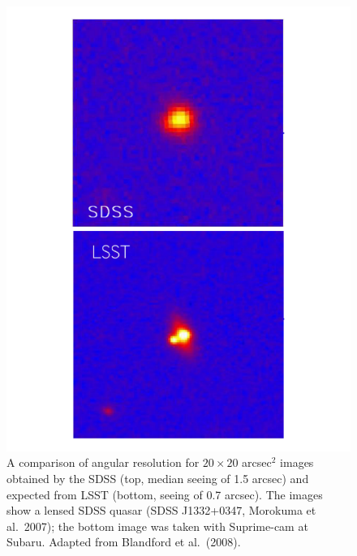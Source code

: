 \begin{figure}
\includegraphics[width=1.0\hsize,clip]{panels2.pdf}
\caption{A comparison of angular resolution for $20\times20$ arcsec$^2$ images obtained
by the SDSS (top, median seeing of 1.5 arcsec) and expected from LSST (bottom,
seeing of 0.7 arcsec). The images show a lensed SDSS quasar (SDSS J1332+0347,
Morokuma et al.~2007); the bottom image was taken with Suprime-cam at Subaru.
Adapted from Blandford et al.~(2008).}
\label{Fig:panels2}
\end{figure}

